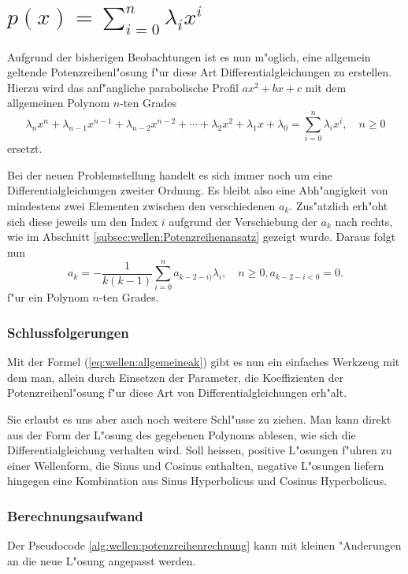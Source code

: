 \section{\texorpdfstring{$p(x) = \sum_{i=0}^{n}\lambda_ix^i$}{p(x) = summe i = 
0 bis n lambdai xi}}

Aufgrund der bisherigen Beobachtungen ist es nun m"oglich, eine 
allgemein geltende Potenzreihenl"osung f"ur diese Art Differentialgleichungen 
zu erstellen. Hierzu wird das anf"angliche parabolische Profil $ax^2 + bx + c$ 
mit dem 
allgemeinen Polynom $n$-ten Grades
\begin{equation*}
	\lambda_nx^n + \lambda_{n-1}x^{n-1} + \lambda_{n-2}x^{n-2} + \dotsb + 
	\lambda_2x^2 + \lambda_1x + \lambda_0 = \sum_{i=0}^{n}\lambda_ix^i, \quad n 
	\ge 0
\end{equation*}
ersetzt.

Bei der neuen Problemstellung handelt es sich immer noch um eine 
Differentialgleichungen zweiter Ordnung. Es bleibt also eine Abh"angigkeit von 
mindestens zwei Elementen zwischen den verschiedenen $a_k$. Zus"atzlich erh"oht 
sich diese jeweils um den Index $i$ aufgrund der Verschiebung der $a_k$ nach 
rechts, wie im Abschnitt \ref{subsec:wellen:Potenzreihenansatz} gezeigt wurde. 
Daraus folgt nun
\begin{equation}
	a_k = -\frac{1}{k(k-1)}\sum_{i=0}^{n}a_{k-2-i)}\lambda_i, \quad n \ge 0, 
	a_{k-2-i < 0} =  0.
	\label{eq:wellen:allgemeineak}
\end{equation}
f"ur ein Polynom $n$-ten Grades.

\subsubsection{Schlussfolgerungen}

Mit der Formel (\ref{eq:wellen:allgemeineak}) gibt es nun ein einfaches 
Werkzeug mit dem man, allein durch Einsetzen der Parameter, die Koeffizienten 
der Potenzreihenl"osung f"ur diese Art von Differentialgleichungen erh"alt.

Sie erlaubt es uns aber auch noch weitere Schl"usse zu ziehen. Man kann direkt 
aus der Form der L"osung des gegebenen Polynoms ablesen, wie sich die 
Differentialgleichung verhalten wird. Soll heissen, positive L"osungen 
f"uhren zu einer Wellenform, die Sinus und Cosinus enthalten, negative 
L"osungen liefern hingegen eine Kombination aus Sinus Hyperbolicus und Cosinus 
Hyperbolicus.

\subsubsection{Berechnungsaufwand}
Der Pseudocode \ref{alg:wellen:potenzreihenrechnung} kann mit kleinen 
"Anderungen an die neue L"osung angepasst werden. 







